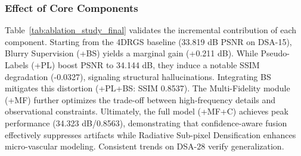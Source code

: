 \documentclass[runningheads]{llncs}
\begin{document}

\subsubsection{Effect of Core Components} Table~\ref{tab:ablation_study_final} validates the incremental contribution of each component. Starting from the 4DRGS baseline (33.819 dB PSNR on DSA-15), Blurry Supervision (+BS) yields a marginal gain (+0.211 dB). While Pseudo-Labels (+PL) boost PSNR to 34.144 dB, they induce a notable SSIM degradation (-0.0327), signaling structural hallucinations. Integrating BS mitigates this distortion (+PL+BS: SSIM 0.8537). The Multi-Fidelity module (+MF) further optimizes the trade-off between high-frequency details and observational constraints. Ultimately, the full model (+MF+C) achieves peak performance (34.323 dB/0.8563), demonstrating that confidence-aware fusion effectively suppresses artifacts while Radiative Sub-pixel Densification enhances micro-vascular modeling. Consistent trends on DSA-28 verify generalization.
\end{document}
